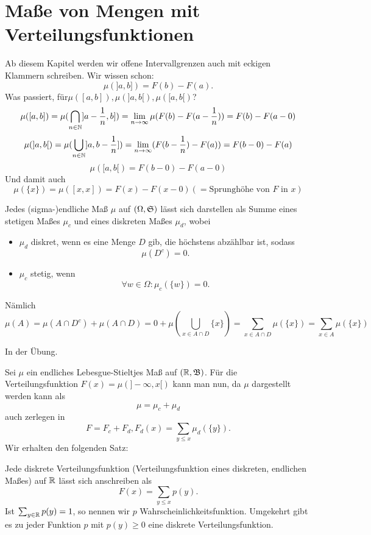 		\section{Maße von Mengen mit Verteilungsfunktionen}
			Ab diesem Kapitel werden wir offene Intervallgrenzen auch mit eckigen Klammern schreiben.\newline
			Wir wissen schon:
			\[ \mu(]a,b])=F(b)-F(a). \]
			Was passiert, für$\mu([a,b]), \mu(]a,b[), \mu([a,b[)$? 
			\[ \mu([a,b])=\mu(\bigcap_{n\in\mathbb{N}}]a-\frac{1}{n},b])=\lim_{n\to\infty}\mu(F(b)-F(a-\frac{1}{n}))=F(b)-F(a-0) \]
			\[ \mu(]a,b[)=\mu(\bigcup_{n\in\mathbb{N}}]a,b-\frac{1}{n}])=\lim_{n\to\infty}(F(b-\frac{1}{n})-F(a))=F(b-0)-F(a) \]
			\[ \mu([a,b[)=F(b-0)-F(a-0) \]
			Und damit auch 
			\[ \mu(\{x\})=\mu([x,x])=F(x)-F(x-0) (=\text{Sprunghöhe von $F\text{ in $x$}$}) \]
			\begin{satz}
				Jedes (sigma-)endliche Maß $\mu$ auf $(\Omega, \mathfrak{S})$ lässt sich darstellen als Summe eines stetigen Maßes $\mu_c$ und eines diskreten Maßes $\mu_d$, wobei
				\begin{itemize}
					\item $\mu_d$ diskret, wenn es eine Menge $D$ gib, die höchstens abzählbar ist, sodass
					\[ \mu(D^c)=0. \]
					\item $\mu_c$ stetig, wenn 
					\[ \forall w\in\Omega: \mu_c(\{w\})=0. \]
				\end{itemize}
				Nämlich
				\[ \mu(A)=\mu(A\cap D^c)+\mu(A\cap D)=0+\mu(\bigcup_{x\in A\cap D} \{x\})=\sum_{x\in A\cap D}\mu(\{x\})=\sum_{x\in A}\mu(\{x\}) \]
			\end{satz}
			
			\begin{bew}
				In der Übung.
			\end{bew}
			
			\begin{bsp}
				Sei $\mu$ ein endliches Lebesgue-Stieltjes Maß auf $(\mathbb{R},\mathfrak{B})$. Für die Verteilungsfunktion $F(x)=\mu(]-\infty,x[)$ kann man nun, da $\mu$ dargestellt werden kann als
				\[ \mu=\mu_c+\mu_d \]
				auch zerlegen in 
				\[ F=F_c+F_d, F_d(x)=\sum_{y\le x} \mu_d(\{y\}).\]
				Wir erhalten den folgenden Satz:
			\end{bsp}
			
			\begin{satz}
				Jede diskrete Verteilungsfunktion (Verteilungsfunktion eines diskreten, endlichen Maßes) auf $\mathbb{R}$ lässt sich anschreiben als
				\[ F(x)=\sum_{y\le x} p(y). \]
				Ist $\sum_{y\in\mathbb{R}} p(y)=1$, so nennen wir $p$ Wahrscheinlichkeitsfunktion. Umgekehrt gibt es zu jeder Funktion $p$ mit $p(y)\ge 0$ eine diskrete Verteilungsfunktion. 
			\end{satz}
			

